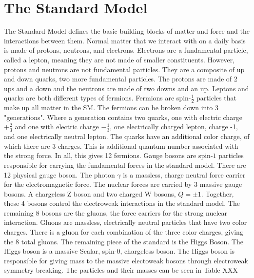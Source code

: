 \section{The Standard Model}
The Standard Model defines the basic building blocks of matter and force and the interactions between them. Normal matter that we interact with on a daily basis is made of protons, neutrons, and electrons. Electrons are a fundamental particle, called a lepton, meaning they are not made of smaller constituents. However, protons and neutrons are not fundamental particles. They are a composite of up and down quarks, two more fundamental particles. The protons are made of 2 ups and a down and the neutrons are made of two downs and an up. Leptons and quarks are both different types of fermions. \linebreak
\indent Fermions are spin-${\frac{1}{2}}$ particles that make up all matter in the SM. The fermions can be broken down into 3 "generations". Where a generation contains two quarks, one with electric charge ${+\frac{2}{3}}$ and one with electric charge ${-\frac{1}{3}}$, one electrically charged lepton, charge -1, and one electrically neutral lepton. The quarks have an additional color charge, of which there are 3 charges. This is additional quantum number associated with the strong force. In all, this gives 12 fermions. \linebreak
\indent Gauge bosons are spin-${1}$ particles responsible for carrying the fundamental forces in the standard model. There are 12 physical gauge boson. The photon ${\gamma}$ is a massless, charge neutral force carrier for the electromagnetic force. The nuclear forces are carried by 3 massive gauge bosons. A chargeless Z boson and two charged W bosons, ${Q = \pm 1}$. Together, these 4 bosons control the electroweak interactions in the standard model. The remaining 8 bosons are the gluons, the force carriers for the strong nuclear interaction. Gluons are massless, electrically neutral particles that have two color charges. There is a gluon for each combination of the three color charges, giving the 8 total gluons. \linebreak
\indent The remaining piece of the standard is the Higgs Boson. The Higgs boson is a massive Scalar, spin-${0}$, chargeless boson. The Higgs boson is responsible for giving mass to the massive electoweak bosons through electroweak symmetry breaking. The particles and their masses can be seen in Table XXX\linebreak
\indent %
